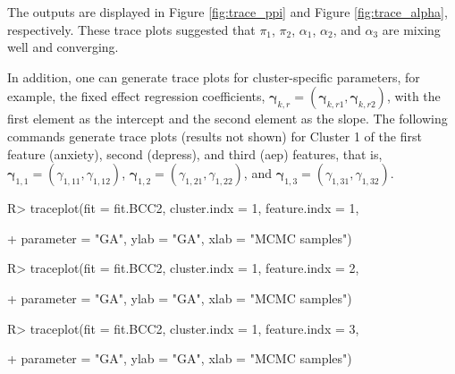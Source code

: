 The outputs are displayed in Figure \ref{fig:trace_ppi} and Figure \ref{fig:trace_alpha}, respectively. These trace plots suggested that $\pi_1$, $\pi_2$, $\alpha_1$, $\alpha_2$, and $\alpha_3$ are mixing well and converging. 

In addition, one can generate trace plots for cluster-specific parameters, for example, the fixed effect regression coefficients, $\boldsymbol{\gamma}_{k, r} = (\boldsymbol{\gamma}_{k, r1}, \boldsymbol{\gamma}_{k, r2})$, with the first element as the intercept and the second element as the slope. The following commands generate trace plots (results not shown) for Cluster 1 of the first feature (anxiety), second (depress), and third (aep) features, that is,  $\boldsymbol{\gamma}_{1,1} = (\gamma_{1,11}, \gamma_{1,12})$,  $\boldsymbol{\gamma}_{1,2} = (\gamma_{1,21}, \gamma_{1,22})$, and $\boldsymbol{\gamma}_{1,3} = (\gamma_{1,31}, \gamma_{1,32})$. 

\begin{example}

R> traceplot(fit = fit.BCC2, cluster.indx = 1, feature.indx = 1,

+        parameter = "GA", ylab = "GA", xlab = "MCMC samples")

R> traceplot(fit = fit.BCC2, cluster.indx = 1, feature.indx = 2,

+        parameter = "GA", ylab = "GA", xlab = "MCMC samples")

R> traceplot(fit = fit.BCC2, cluster.indx = 1, feature.indx = 3,

+        parameter = "GA", ylab = "GA", xlab = "MCMC samples")

\end{example} 




